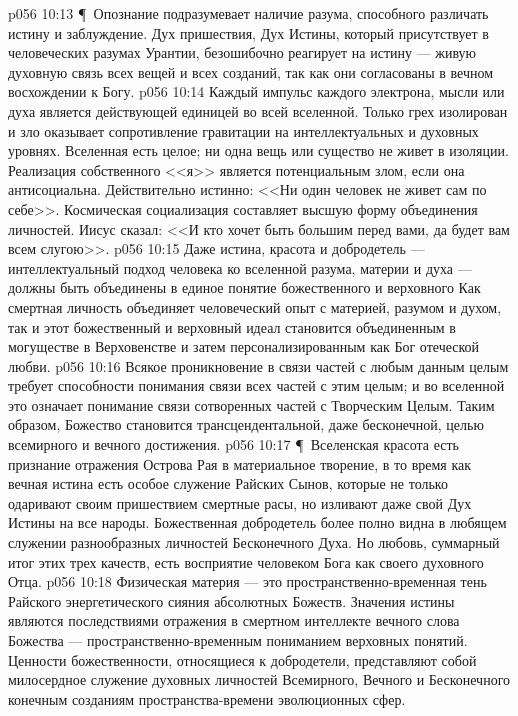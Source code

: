 \vs p056 10:13 \P\ Опознание  подразумевает наличие разума, способного различать истину и заблуждение. Дух пришествия, Дух Истины, который присутствует в человеческих разумах Урантии, безошибочно реагирует на истину --- живую духовную связь всех вещей и всех созданий, так как они согласованы в вечном восхождении к Богу.
\vs p056 10:14 Каждый импульс каждого электрона, мысли или духа является действующей единицей во всей вселенной. Только грех изолирован и зло оказывает сопротивление гравитации на интеллектуальных и духовных уровнях. Вселенная есть целое; ни одна вещь или существо не живет в изоляции. Реализация собственного <<я>> является потенциальным злом, если она антисоциальна. Действительно истинно: <<Ни один человек не живет сам по себе>>. Космическая социализация составляет высшую форму объединения личностей. Иисус сказал: <<И кто хочет быть большим перед вами, да будет вам всем слугою>>.
\vs p056 10:15 Даже истина, красота и добродетель --- интеллектуальный подход человека ко вселенной разума, материи и духа --- должны быть объединены в единое понятие божественного и верховного  Как смертная личность объединяет человеческий опыт с материей, разумом и духом, так и этот божественный и верховный идеал становится объединенным в могуществе в Верховенстве и затем персонализированным как Бог отеческой любви.
\vs p056 10:16 Всякое проникновение в связи частей с любым данным целым требует способности понимания связи всех частей с этим целым; и во вселенной это означает понимание связи сотворенных частей с Творческим Целым. Таким образом, Божество становится трансцендентальной, даже бесконечной, целью всемирного и вечного достижения.
\vs p056 10:17 \P\ Вселенская красота есть признание отражения Острова Рая в материальное творение, в то время как вечная истина есть особое служение Райских Сынов, которые не только одаривают своим пришествием смертные расы, но изливают даже свой Дух Истины на все народы. Божественная добродетель более полно видна в любящем служении разнообразных личностей Бесконечного Духа. Но любовь, суммарный итог этих трех качеств, есть восприятие человеком Бога как своего духовного Отца.
\vs p056 10:18 Физическая материя --- это пространственно\hyp{}временная тень Райского энергетического сияния абсолютных Божеств. Значения истины являются последствиями отражения в смертном интеллекте вечного слова Божества --- пространственно\hyp{}временным пониманием верховных понятий. Ценности божественности, относящиеся к добродетели, представляют собой милосердное служение духовных личностей Всемирного, Вечного и Бесконечного конечным созданиям пространства\hyp{}времени эволюционных сфер.

